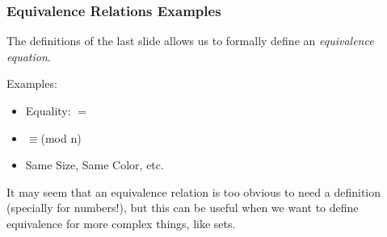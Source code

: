 \begin{frame}
  \frametitle{Equivalence Relations Examples}

  The definitions of the last slide allows us to formally define an \emph{equivalence equation}.\bigskip

  {\larger
    Examples:
    \begin{itemize}
    \item Equality: $=$
    \item $\equiv $(mod n)
    \item Same Size, Same Color, etc.
    \end{itemize}
  }\bigskip

  It may seem that an equivalence relation is too obvious to need a definition (specially for numbers!), but this can be useful when we want to define equivalence for more complex things, like sets.

\end{frame}

